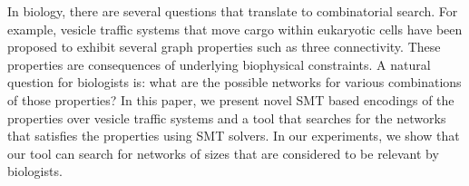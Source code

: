 In biology, there are several questions that translate to combinatorial
search. For example, vesicle traffic systems that move cargo within
eukaryotic cells have been proposed to exhibit several graph properties
such as three connectivity. These properties are consequences of underlying
biophysical constraints. A natural question for biologists is: what are the
possible networks for various combinations of those properties? In this
paper, we present novel SMT based encodings of the properties over vesicle traffic
systems and a tool that searches for the networks that satisfies the
properties using SMT solvers. In our experiments, we show that our tool
can search for networks of sizes that are considered to be relevant by
biologists.



